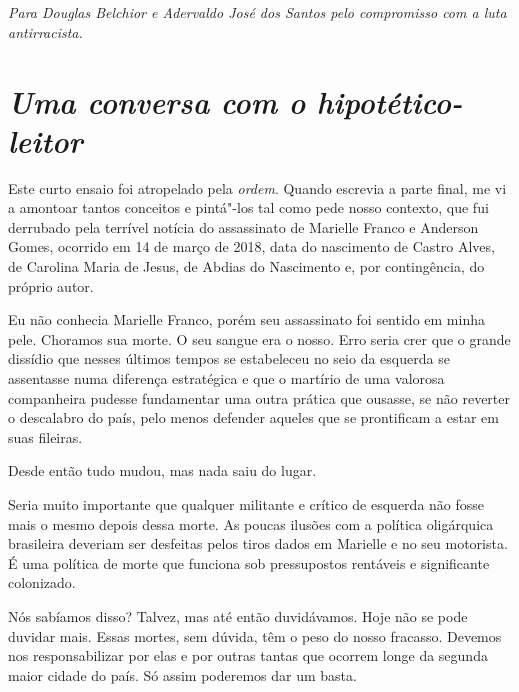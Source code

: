 \chapter*{}

\vfill
\begin{flushright}
\emph{Para Douglas Belchior e Adervaldo José dos Santos pelo compromisso
com a luta antirracista.}
\end{flushright}
\thispagestyle{empty}

\chapter{\emph{Uma conversa com o hipotético-leitor}}

Este curto ensaio foi atropelado pela \emph{ordem}. Quando escrevia a
parte final, me vi a amontoar tantos conceitos e pintá"-los tal como pede
nosso contexto, que fui derrubado pela terrível notícia do assassinato
de Marielle Franco e Anderson Gomes, ocorrido em 14 de março de 2018,
data do nascimento de Castro Alves, de Carolina Maria de Jesus, de
Abdias do Nascimento e, por contingência, do próprio autor.

Eu não conhecia Marielle Franco, porém seu assassinato foi sentido em
minha pele. Choramos sua morte. O seu sangue era o nosso. Erro seria
crer que o grande dissídio que nesses últimos tempos se estabeleceu no
seio da esquerda se assentasse numa diferença estratégica e que o
martírio de uma valorosa companheira pudesse fundamentar uma outra
prática que ousasse, se não reverter o descalabro do país, pelo menos
defender aqueles que se prontificam a estar em suas fileiras.

Desde então tudo mudou, mas nada saiu do lugar.

Seria muito importante que qualquer militante e crítico de esquerda não
fosse mais o mesmo depois dessa morte. As poucas ilusões com a política
oligárquica brasileira deveriam ser desfeitas pelos tiros dados em
Marielle e no seu motorista. É uma política de morte que funciona sob
pressupostos rentáveis e significante colonizado.

Nós sabíamos disso? Talvez, mas até então duvidávamos. Hoje não se pode
duvidar mais. Essas mortes, sem dúvida, têm o peso do nosso fracasso.
Devemos nos responsabilizar por elas e por outras tantas que ocorrem
longe da segunda maior cidade do país. Só assim poderemos dar um basta.

